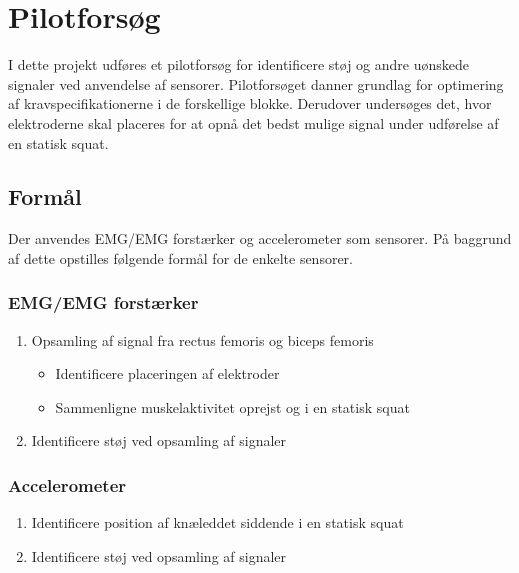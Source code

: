 \section{Pilotforsøg}
I dette projekt udføres et pilotforsøg for identificere støj og andre uønskede signaler ved anvendelse af sensorer. Pilotforsøget danner grundlag for optimering af kravspecifikationerne i de forskellige blokke. Derudover undersøges det, hvor elektroderne skal placeres for at opnå det bedst mulige signal under udførelse af en statisk squat.

\subsection{Formål}
Der anvendes EMG/EMG forstærker og accelerometer som sensorer. På baggrund af dette opstilles følgende formål for de enkelte sensorer.  

\subsubsection{EMG/EMG forstærker}
\begin{enumerate}
\item Opsamling af signal fra rectus femoris og biceps femoris
\begin{itemize}
\item Identificere placeringen af elektroder
\item Sammenligne muskelaktivitet oprejst og i en statisk squat 
\end{itemize}
\item Identificere støj ved opsamling af signaler
\end{enumerate}


\subsubsection{Accelerometer}
\begin{enumerate}
\item Identificere position af knæleddet siddende i en statisk squat
\item Identificere støj ved opsamling af signaler
\end{enumerate}


